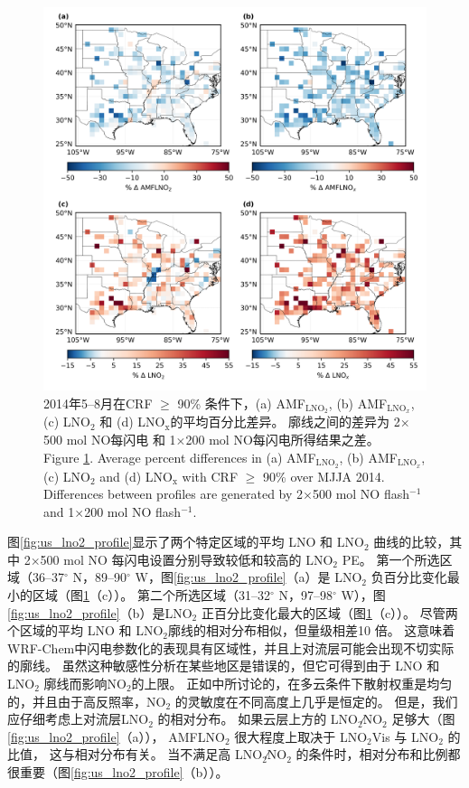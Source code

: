 \begin{figure}[t]
\centering
\includegraphics[width=13cm]{./figures/us_simulation_diff.png}
\caption{2014年5--8月在CRF $\geq$ 90\% 条件下，(a) AMF$_{\textrm{LNO$_2$}}$, (b) AMF$_{\textrm{LNO$_x$}}$, (c) LNO$_\textrm{2}$ 和 (d) LNO$_\textrm{x}$的平均百分比差异。
廓线之间的差异为 2$\times$500 mol NO每闪电 和 1$\times$200 mol NO每闪电所得结果之差。\\
Figure \ref{fig:us_simulation_diff}. Average percent differences in (a) AMF$_{\textrm{LNO$_2$}}$, (b) AMF$_{\textrm{LNO$_x$}}$, (c) LNO$_\textrm{2}$ and (d) LNO$_\textrm{x}$ with CRF $\geq$ 90\% over MJJA 2014.
Differences between profiles are generated by 2$\times$500 mol NO flash$^{-1}$ and 1$\times$200 mol NO flash$^{-1}$.}
\label{fig:us_simulation_diff}
\end{figure}

图\ref{fig:us_lno2_profile}显示了两个特定区域的平均 LNO 和 LNO$_2$ 曲线的比较，其中 2$\times$500 mol NO 每闪电设置分别导致较低和较高的 LNO$_2$ PE。
第一个所选区域（36--37$^{\circ}$ N，89--90$^{\circ}$ W，图\ref{fig:us_lno2_profile}（a）是 LNO$_2$ 负百分比变化最小的区域（图\ref{fig:us_simulation_diff}（c））。
第二个所选区域（31--32$^{\circ}$ N，97--98$^{\circ}$ W），图\ref{fig:us_lno2_profile}（b）是LNO$_2$ 正百分比变化最大的区域（图\ref{fig:us_simulation_diff}（c））。
尽管两个区域的平均 LNO 和 LNO$_2$廓线的相对分布相似，但量级相差10 倍。
这意味着 WRF-Chem中闪电参数化的表现具有区域性，并且上对流层可能会出现不切实际的廓线。
虽然这种敏感性分析在某些地区是错误的，但它可得到由于 LNO 和 LNO$_2$ 廓线而影响NO$_2$的上限。
正如\citet{Laughner.2017}中所讨论的，在多云条件下散射权重是均匀的，并且由于高反照率，NO$_2$ 的灵敏度在不同高度上几乎是恒定的。
但是，我们应仔细考虑上对流层LNO$_2$ 的相对分布。
如果云层上方的 LNO$_2$∕NO$_2$ 足够大（图\ref{fig:us_lno2_profile}（a）），
AMFLNO$_2$ 很大程度上取决于 LNO$_2$Vis 与 LNO$_2$ 的比值，
这与相对分布有关。
当不满足高 LNO$_2$∕NO$_2$ 的条件时，相对分布和比例都很重要（图\ref{fig:us_lno2_profile}（b））。

